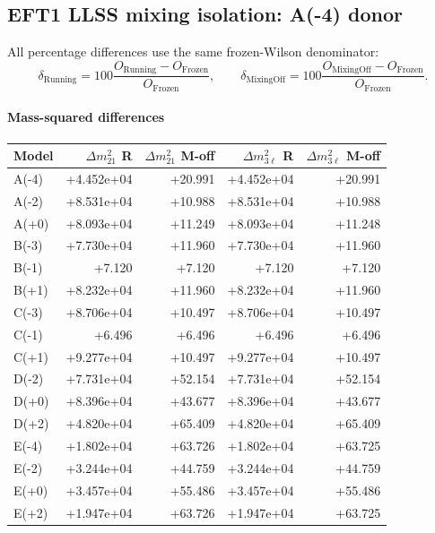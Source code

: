 \subsection*{EFT1 LLSS mixing isolation: A(-4) donor}
All percentage differences use the same frozen-Wilson denominator:
\[\delta_{\mathrm{Running}}=100\frac{O_{\mathrm{Running}}-O_{\mathrm{Frozen}}}{O_{\mathrm{Frozen}}},\qquad\delta_{\mathrm{MixingOff}}=100\frac{O_{\mathrm{MixingOff}}-O_{\mathrm{Frozen}}}{O_{\mathrm{Frozen}}}.\]
\paragraph{Mass-squared differences}
\begin{center}
\begin{tabular}{lrrrr}
\hline
Model & $\Delta m^2_{21}$ R & $\Delta m^2_{21}$ M-off & $\Delta m^2_{3\ell}$ R & $\Delta m^2_{3\ell}$ M-off \\
\hline
A(-4) & +4.452e+04 & +20.991 & +4.452e+04 & +20.991 \\
A(-2) & +8.531e+04 & +10.988 & +8.531e+04 & +10.988 \\
A(+0) & +8.093e+04 & +11.249 & +8.093e+04 & +11.248 \\
B(-3) & +7.730e+04 & +11.960 & +7.730e+04 & +11.960 \\
B(-1) & +7.120 & +7.120 & +7.120 & +7.120 \\
B(+1) & +8.232e+04 & +11.960 & +8.232e+04 & +11.960 \\
C(-3) & +8.706e+04 & +10.497 & +8.706e+04 & +10.497 \\
C(-1) & +6.496 & +6.496 & +6.496 & +6.496 \\
C(+1) & +9.277e+04 & +10.497 & +9.277e+04 & +10.497 \\
D(-2) & +7.731e+04 & +52.154 & +7.731e+04 & +52.154 \\
D(+0) & +8.396e+04 & +43.677 & +8.396e+04 & +43.677 \\
D(+2) & +4.820e+04 & +65.409 & +4.820e+04 & +65.409 \\
E(-4) & +1.802e+04 & +63.726 & +1.802e+04 & +63.725 \\
E(-2) & +3.244e+04 & +44.759 & +3.244e+04 & +44.759 \\
E(+0) & +3.457e+04 & +55.486 & +3.457e+04 & +55.486 \\
E(+2) & +1.947e+04 & +63.726 & +1.947e+04 & +63.725 \\
\hline
\end{tabular}
\end{center}
